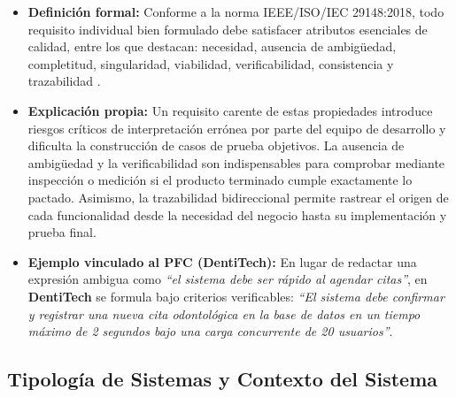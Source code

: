 \documentclass[11pt,a4paper]{article}
\begin{document}
\begin{itemize}
    \item \textbf{Definición formal:} Conforme a la norma IEEE/ISO/IEC 29148:2018, todo requisito individual bien formulado debe satisfacer atributos esenciales de calidad, entre los que destacan: necesidad, ausencia de ambigüedad, completitud, singularidad, viabilidad, verificabilidad, consistencia y trazabilidad \cite{ieee29148, ireb2023}.
    \item \textbf{Explicación propia:} Un requisito carente de estas propiedades introduce riesgos críticos de interpretación errónea por parte del equipo de desarrollo y dificulta la construcción de casos de prueba objetivos. La ausencia de ambigüedad y la verificabilidad son indispensables para comprobar mediante inspección o medición si el producto terminado cumple exactamente lo pactado. Asimismo, la trazabilidad bidireccional permite rastrear el origen de cada funcionalidad desde la necesidad del negocio hasta su implementación y prueba final.
    \item \textbf{Ejemplo vinculado al PFC (DentiTech):} En lugar de redactar una expresión ambigua como \textit{``el sistema debe ser rápido al agendar citas''}, en \textbf{DentiTech} se formula bajo criterios verificables: \textit{``El sistema debe confirmar y registrar una nueva cita odontológica en la base de datos en un tiempo máximo de 2 segundos bajo una carga concurrente de 20 usuarios''}.
\end{itemize}

\subsection{Tipología de Sistemas y Contexto del Sistema}
\end{document}
